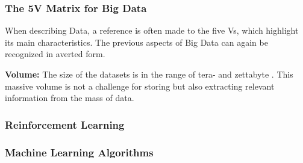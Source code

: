 \subsubsection{The 5V Matrix for Big Data}
When describing Data, a reference is often made to the five Vs,
which highlight its main characteristics.
The previous aspects of Big Data can again be recognized in averted form. 

\textbf{Volume:} The size of the datasets is in the range of tera- and zettabyte
. This massive volume is not a challenge for storing but also extracting
relevant information from the mass of data. 

\subsubsection{Reinforcement Learning}

\subsubsection{Machine Learning Algorithms}